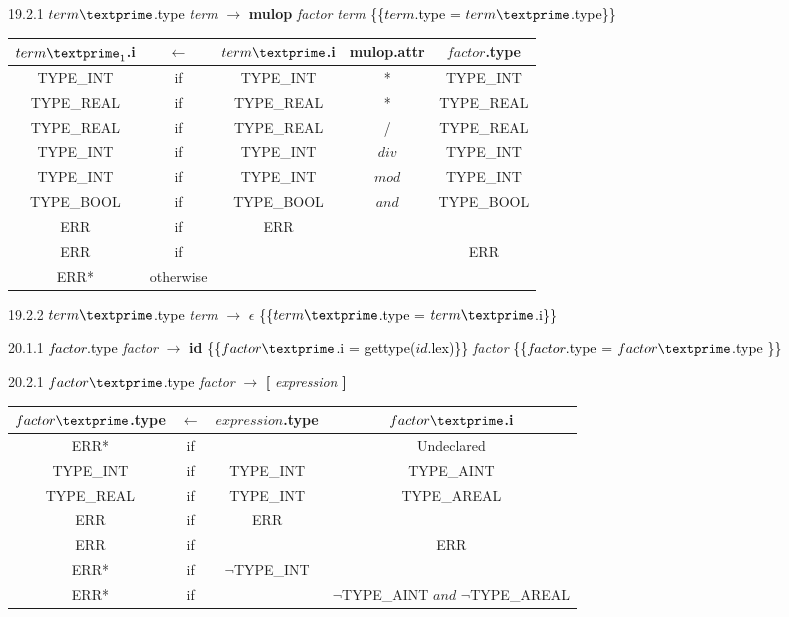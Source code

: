 19.2.1 \textcolor{black}{$term\textprime$.type} \emph{term\textprime} $\rightarrow$ \textbf{mulop} \emph{factor} \emph{term\textprime} \textcolor{black}{\{\{$term$.type = $term\textprime$.type\}\}}

\begin{tabular}[t]{|c|c|c|c|c|}
  \hline

 $term\textprime_1$.i & \textbf{$\leftarrow$} & $term\textprime$.i & \textbf{mulop}.attr &  $factor$.type \\

  \hline

  TYPE\_INT & if & TYPE\_INT & * & TYPE\_INT \\
  TYPE\_REAL & if & TYPE\_REAL & * & TYPE\_REAL \\
  TYPE\_REAL & if & TYPE\_REAL & / & TYPE\_REAL \\
  TYPE\_INT & if & TYPE\_INT & $div$ & TYPE\_INT \\
  TYPE\_INT & if & TYPE\_INT & $mod$ & TYPE\_INT \\
  TYPE\_BOOL & if & TYPE\_BOOL & $and$ & TYPE\_BOOL \\
  ERR & if & ERR & & \\
  ERR & if & & & ERR \\
  ERR* & otherwise & & & \\
  \hline

\end{tabular}

19.2.2 \textcolor{black}{$term\textprime$.type} \emph{term\textprime} $\rightarrow$ $\epsilon$ \textcolor{black}{\{\{$term\textprime$.type = $term\textprime$.i\}\}}

\clearpage{}
20.1.1 \textcolor{black}{$factor$.type} \emph{factor} $\rightarrow$ \textbf{id} \textcolor{black}{\{\{$factor\textprime$.i = gettype($id$.lex)\}\}} \emph{factor\textprime} \textcolor{black}{\{\{$factor$.type = $factor\textprime$.type \}\}}

20.2.1 \textcolor{black}{$factor\textprime$.type} \emph{factor\textprime} $\rightarrow$ \textbf{[} \emph{expression} \textbf{]}

\begin{tabular}[t]{|c|c|c|c|}
  \hline

  $factor\textprime$.type & \textbf{$\leftarrow$} & $expression$.type & $factor\textprime$.i \\

  \hline
  ERR* & if & & Undeclared \\
  TYPE\_INT & if & TYPE\_INT & TYPE\_AINT \\
  TYPE\_REAL & if & TYPE\_INT & TYPE\_AREAL \\
  ERR & if & ERR & \\
  ERR & if & & ERR \\
  ERR* & if & $\neg$TYPE\_INT & \\
  ERR* & if & & $\neg$TYPE\_AINT $and$ $\neg$TYPE\_AREAL \\

  \hline

\end{tabular}

